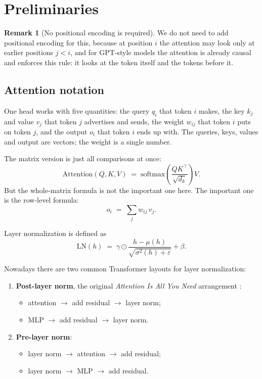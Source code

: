 \documentclass[10pt]{article}
\theoremstyle{definition}
\newtheorem{remark}{Remark}
\newcommand{\LN}{\mathrm{LN}}
\begin{document}
\section{Preliminaries}
\label{sec:prelim}
\begin{remark}[No positional encoding is required]
\label{rem:nope}
We do not need to add positional encoding for this, because at position
$i$ the attention may look only at earlier positions $j < i$, and for
GPT-style models the attention is already causal and enforces this rule:
it looks at the token itself and the tokens before it.
\end{remark}


\subsection{Attention notation}

One head works with five quantities: the query $q_i$ that token $i$ makes,
the key $k_j$ and value $v_j$ that token $j$ advertises and sends, the
weight $w_{ij}$ that token $i$ puts on token $j$, and the output $o_i$ that
token $i$ ends up with. The queries, keys, values and output are vectors;
the weight is a single number.

The matrix version is just all comparisons at once:
\begin{equation}
\mathrm{Attention}(Q,K,V) \;=\; \mathrm{softmax}\!\left(\frac{QK^{\top}}{\sqrt{d_k}}\right)V .
\label{eq:attn-matrix}
\end{equation}
But the whole-matrix formula is not the important one here. The important
one is the row-level formula:
\begin{equation}
o_i \;=\; \sum_j w_{ij}\, v_j .
\label{eq:attn-row}
\end{equation}

Layer normalization is defined as
\begin{equation}
\LN(h) \;=\; \gamma \odot \frac{h - \mu(h)}{\sqrt{\sigma^{2}(h) + \varepsilon}} + \beta .
\label{eq:layernorm}
\end{equation}

Nowadays there are two common Transformer layouts for layer
normalization:
\begin{enumerate}
\item \textbf{Post-layer norm}, the original \emph{Attention Is All You
  Need} arrangement \citep{vaswani2017}:
  \begin{itemize}
  \item attention $\rightarrow$ add residual $\rightarrow$ layer norm;
  \item MLP $\rightarrow$ add residual $\rightarrow$ layer norm.
  \end{itemize}
\item \textbf{Pre-layer norm}:
  \begin{itemize}
  \item layer norm $\rightarrow$ attention $\rightarrow$ add residual;
  \item layer norm $\rightarrow$ MLP $\rightarrow$ add residual.
  \end{itemize}
\end{enumerate}
\end{document}
